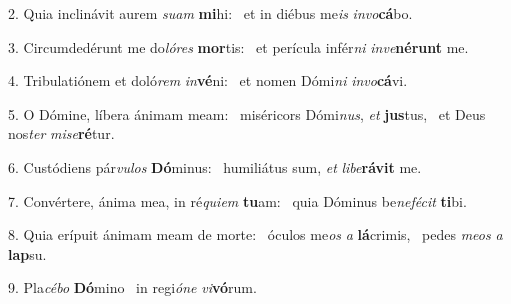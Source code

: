 2. Quia inclinávit aurem \textit{su}\textit{am} \textbf{mi}hi: \ast\  et in diébus me\textit{is} \textit{in}\textit{vo}\textbf{cá}bo.\

3. Circumdedérunt me do\textit{ló}\textit{res} \textbf{mor}tis: \ast\  et perícula infér\textit{ni} \textit{in}\textit{ve}\textbf{né}\textbf{runt} me.\

4. Tribulatiónem et doló\textit{rem} \textit{in}\textbf{vé}ni: \ast\  et nomen Dómi\textit{ni} \textit{in}\textit{vo}\textbf{cá}vi.\

5. O Dómine, líbera ánimam meam: \dag\  miséricors Dómi\textit{nus}, \textit{et} \textbf{jus}tus, \ast\  et Deus nos\textit{ter} \textit{mi}\textit{se}\textbf{ré}tur.\

6. Custódiens pár\textit{vu}\textit{los} \textbf{Dó}minus: \ast\  humiliátus sum, \textit{et} \textit{li}\textit{be}\textbf{rá}\textbf{vit} me.\

7. Convértere, ánima mea, in ré\textit{qui}\textit{em} \textbf{tu}am: \ast\  quia Dóminus be\textit{ne}\textit{fé}\textit{cit} \textbf{ti}bi.\

8. Quia erípuit ánimam meam de morte: \dag\  óculos me\textit{os} \textit{a} \textbf{lá}crimis, \ast\  pedes \textit{me}\textit{os} \textit{a} \textbf{lap}su.\

9. Pla\textit{cé}\textit{bo} \textbf{Dó}mino \ast\  in regi\textit{ó}\textit{ne} \textit{vi}\textbf{vó}rum.\

